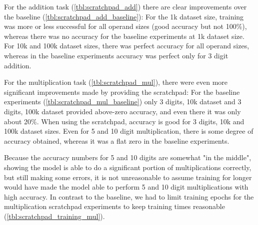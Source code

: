 For the addition task  (\cref{tbl:scratchpad_add}) there are clear improvements over the baseline (\cref{tbl:scratchpad_add_baseline}): For the 1k dataset size, training was more or less successful for all operand sizes (good accuracy but not 100\%), whereas there was no accuracy for the baseline experiments at 1k dataset size.
For 10k and 100k dataset sizes, there was perfect accuracy for all operand sizes, whereas in the baseline experiments accuracy was perfect only for 3 digit addition.

\begin{table}[H]
	\begin{minipage}[t]{0.47\linewidth}
		\hfill
		\label{tbl:scratchpad_mul}
	\end{minipage}
	\hfill %
	\begin{minipage}[t]{0.47\linewidth}
		\hfill
		\label{tbl:scratchpad_mul_baseline}
	\end{minipage}
\end{table}


For the multiplication task (\cref{tbl:scratchpad_mul}), there were even more significant improvements made by providing the scratchpad: For the baseline experiments (\cref{tbl:scratchpad_mul_baseline}) only 3 digits, 10k dataset and 3 digits, 100k dataset provided above-zero accuracy, and even there it was only about 20\%. When using the scratchpad, accuracy is good for 
3 digits, 10k and 100k dataset sizes. Even for 5 and 10 digit multiplication, there is some degree of accuracy obtained, whereas it was a flat zero in the baseline experiments.

Because the accuracy numbers for 5 and 10 digits are somewhat "in the middle", showing the model is able to do a significant portion of multiplications correctly, but still making some errors, it is not unreasonable to assume training for longer would have made the model able to perform 5 and 10 digit multiplications with high accuracy. In contrast to the baseline, we had to limit training epochs for the multiplication scratchpad experiments to keep training times reasonable (\cref{tbl:scratchpad_training_mul}).


